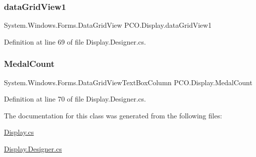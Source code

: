 \mbox{\label{classPCO_1_1Display_a40e298d0adbdf8c69c05974007a9348c}} 
\subsubsection{\texorpdfstring{data\+Grid\+View1}{dataGridView1}}
{\footnotesize\ttfamily System.\+Windows.\+Forms.\+Data\+Grid\+View P\+C\+O.\+Display.\+data\+Grid\+View1\hspace{0.3cm}{\ttfamily [private]}}



Definition at line 69 of file Display.\+Designer.\+cs.

\mbox{\label{classPCO_1_1Display_ab8487665b5430a76cd75c193a7cc0854}} 
\subsubsection{\texorpdfstring{Medal\+Count}{MedalCount}}
{\footnotesize\ttfamily System.\+Windows.\+Forms.\+Data\+Grid\+View\+Text\+Box\+Column P\+C\+O.\+Display.\+Medal\+Count\hspace{0.3cm}{\ttfamily [private]}}



Definition at line 70 of file Display.\+Designer.\+cs.



The documentation for this class was generated from the following files\+:\begin{DoxyCompactItemize}
\item 
\hyperlink{Display_8cs}{Display.\+cs}\item 
\hyperlink{Display_8Designer_8cs}{Display.\+Designer.\+cs}\end{DoxyCompactItemize}
